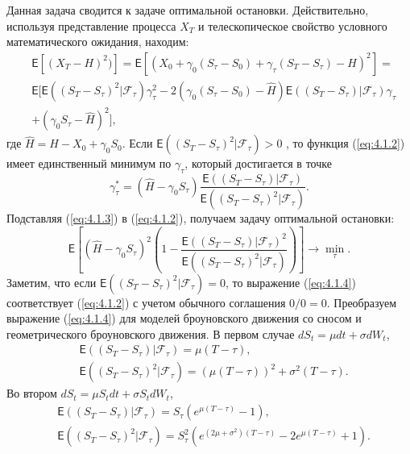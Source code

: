 Данная задача сводится к задаче оптимальной остановки. Действительно, используя представление процесса $X_T$ и телескопическое свойство условного математического ожидания, находим:
\begin{align}
 \label{eq:4.1.2}
 & \mathsf E[(X_T-H)^2)]=\mathsf E[(X_0+\gamma_0 (S_\tau-S_0) +\gamma_\tau (S_T-S_\tau) - H)^2]= \nonumber \\
 & \mathsf E[\mathsf E((S_T-S_\tau)^2|\mathscr F_\tau)\gamma_\tau^2-2(\gamma_0(S_\tau-S_0) - \widehat H) \mathsf E((S_T-S_\tau) | \mathscr F_\tau)\gamma_\tau\nonumber \\
 &+(\gamma_0 S_\tau - \widehat H)^2],
\end{align}
где $\widehat H = H-X_0+\gamma_0 S_0$.  Если $\mathsf E((S_T-S_\tau)^2|\mathscr F_\tau) > 0$ , то функция (\ref{eq:4.1.2}) имеет единственный минимум по $\gamma_\tau$, который достигается в точке
\begin{equation}
 \label{eq:4.1.3}
 \gamma_\tau^*=(\widehat H-\gamma_0 S_\tau)\frac{\mathsf E((S_T-S_\tau) | \mathscr F_\tau)}{\mathsf E((S_T-S_\tau)^2|\mathscr F_\tau)}.
 \end{equation}
Подставляя (\ref{eq:4.1.3}) в (\ref{eq:4.1.2}), получаем задачу оптимальной остановки:
\begin{equation}
 \label{eq:4.1.4}
 \mathsf E\left[(\widehat H - \gamma_0 S_\tau)^2 \left( 1-\frac{\mathsf E((S_T-S_\tau) | \mathscr F_\tau)^2}{\mathsf E((S_T-S_\tau)^2 | \mathscr F_\tau)}\right)\right] \to \min_{\tau}.
 \end{equation}
Заметим, что если $\mathsf E((S_T-S_\tau)^2|\mathscr F_\tau) = 0$, то выражение (\ref{eq:4.1.4}) соответствует (\ref{eq:4.1.2}) с учетом обычного соглашения $0/0=0$.
Преобразуем выражение (\ref{eq:4.1.4}) для моделей броуновского движения со сносом и геометрического броуновского движения. В первом случае $dS_t=\mu dt+\sigma dW_t$,
\begin{align}
 \label{eq:4.1.5}
 &\mathsf E((S_T-S_\tau) | \mathscr F_\tau)=\mu(T-\tau),\nonumber \\
 &\mathsf E((S_T-S_\tau)^2 | \mathscr F_\tau)=(\mu(T-\tau))^2+\sigma^2(T-\tau).
 \end{align}		
Во втором $dS_t=\mu S_t dt+\sigma S_t dW_t$,
\begin{align}
 \label{eq:4.1.6}
 &\mathsf E((S_T-S_\tau) | \mathscr F_\tau)=S_\tau(e^{\mu(T-\tau)}-1),\nonumber \\
 &\mathsf E((S_T-S_\tau)^2 | \mathscr F_\tau)=S_\tau^2(e^{(2\mu+\sigma^2)(T-\tau)}-2e^{\mu(T-\tau)}+1).
 \end{align}				

